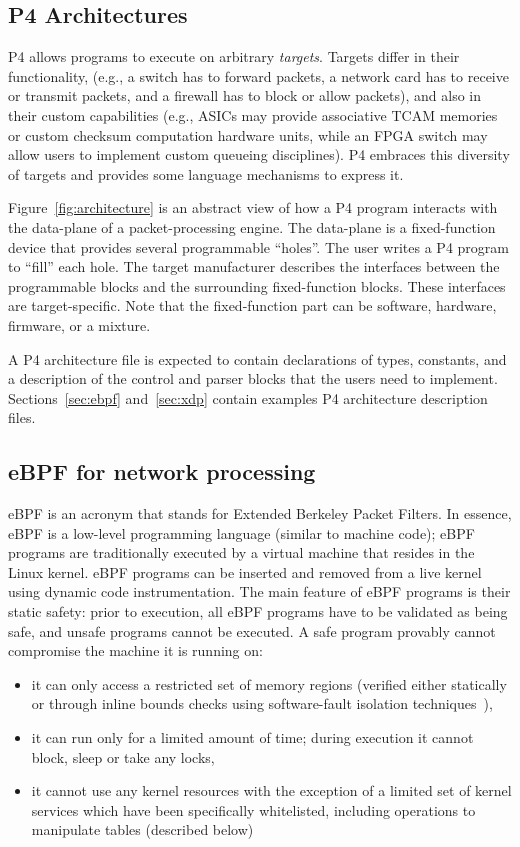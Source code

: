 \subsection{P4 Architectures}

P4 allows programs to execute on arbitrary \emph{targets}.  Targets
differ in their functionality, (e.g., a switch has to forward packets,
a network card has to receive or transmit packets, and a firewall has
to block or allow packets), and also in their custom capabilities
(e.g., ASICs may provide associative TCAM memories or custom checksum
computation hardware units, while an FPGA switch may allow users to
implement custom queueing disciplines).  P4 embraces this diversity of
targets and provides some language mechanisms to express it.


Figure~\ref{fig:architecture} is an abstract view of how a P4 program
interacts with the data-plane of a packet-processing engine.  The
data-plane is a fixed-function device that provides several
programmable ``holes''. The user writes a P4 program to ``fill'' each
hole.  The target manufacturer describes the interfaces between the
programmable blocks and the surrounding fixed-function blocks.  These
interfaces are target-specific.  Note that the fixed-function part can
be software, hardware, firmware, or a mixture.

A P4 architecture file is expected to contain declarations of types,
constants, and a description of the control and parser blocks that the
users need to implement.  Sections~\ref{sec:ebpf} and~\ref{sec:xdp}
contain examples P4 architecture description files.

\subsection{eBPF for network processing}

eBPF is an acronym that stands for Extended Berkeley Packet Filters. In essence,
eBPF is a low-level programming language (similar to machine code);
eBPF programs are traditionally executed by a virtual machine that
resides in the Linux kernel. eBPF programs can be inserted and removed
from a live kernel using dynamic code instrumentation. The main
feature of eBPF programs is their static safety: prior to execution,
all eBPF programs have to be validated as being safe, and unsafe
programs cannot be executed. A safe program provably cannot compromise
the machine it is running on:
\begin{itemize}
\item it can only access a restricted set of memory regions (verified
  either statically or through inline bounds checks using
  software-fault isolation techniques~\cite{wahbe:93}),
\item it can run only for a limited amount of time; during execution
  it cannot block, sleep or take any locks,
\item it cannot use any kernel resources with the exception of a
  limited set of kernel services which have been specifically
  whitelisted, including operations to manipulate tables (described
  below)
\end{itemize}


